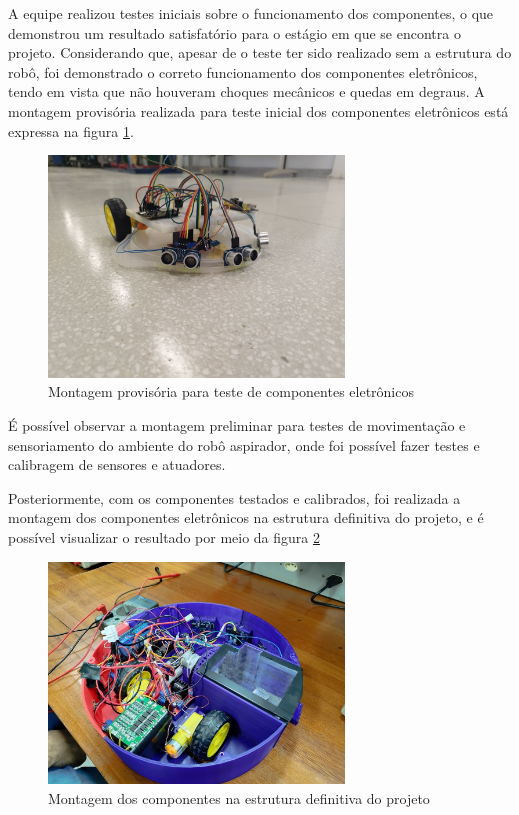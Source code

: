 A equipe realizou testes iniciais sobre o funcionamento dos componentes, o que demonstrou um resultado satisfatório para o estágio em que se encontra o projeto. Considerando que, apesar de o teste ter sido realizado sem a estrutura do robô, foi demonstrado o correto funcionamento dos componentes eletrônicos, tendo em vista que não houveram choques mecânicos e quedas em degraus. A montagem provisória realizada para teste inicial dos componentes eletrônicos está expressa na figura \ref{bocao}.
\begin{figure}[H]
\centering
\includegraphics[width=0.7\textwidth]{editaveis/prot-inic.jpg}
\caption{Montagem provisória para teste de componentes eletrônicos}
\label{bocao}
\end{figure}

É possível observar a montagem preliminar para testes de movimentação e sensoriamento do ambiente do robô aspirador, onde foi possível fazer testes e calibragem de sensores e atuadores.

Posteriormente, com os componentes testados e calibrados, foi realizada a montagem dos componentes eletrônicos na estrutura definitiva do projeto, e é possível visualizar o resultado por meio da figura \ref{fig:bocao-montado}

\begin{figure}[!htb]
\centering
\includegraphics[width=0.7\textwidth]{editaveis/bocao-montado.jpg}
\caption{Montagem dos componentes na estrutura definitiva do projeto}
\label{fig:bocao-montado}
\end{figure}

